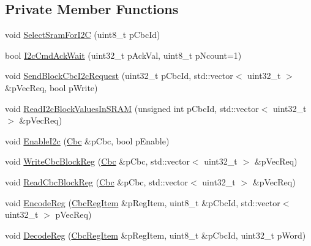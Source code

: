 \subsection*{Private Member Functions}
\begin{DoxyCompactItemize}
\item 
void \hyperlink{class_ph2___hw_interface_1_1_cbc_interface_afecc0475c57cec54253864c7407e765a}{Select\-Sram\-For\-I2\-C} (uint8\-\_\-t p\-Cbc\-Id)
\item 
bool \hyperlink{class_ph2___hw_interface_1_1_cbc_interface_ad171e07d3777cebcdd1f65cc03915e7b}{I2c\-Cmd\-Ack\-Wait} (uint32\-\_\-t p\-Ack\-Val, uint8\-\_\-t p\-Ncount=1)
\item 
void \hyperlink{class_ph2___hw_interface_1_1_cbc_interface_a3abc2efbdff0957b686341b3084b30a2}{Send\-Block\-Cbc\-I2c\-Request} (uint32\-\_\-t p\-Cbc\-Id, std\-::vector$<$ uint32\-\_\-t $>$ \&p\-Vec\-Req, bool p\-Write)
\item 
void \hyperlink{class_ph2___hw_interface_1_1_cbc_interface_a835236b210e7b642f471d862cb8c5f47}{Read\-I2c\-Block\-Values\-In\-S\-R\-A\-M} (unsigned int p\-Cbc\-Id, std\-::vector$<$ uint32\-\_\-t $>$ \&p\-Vec\-Req)
\item 
void \hyperlink{class_ph2___hw_interface_1_1_cbc_interface_a33464f7a75cd7e392d1324e223145b92}{Enable\-I2c} (\hyperlink{class_ph2___hw_description_1_1_cbc}{Cbc} \&p\-Cbc, bool p\-Enable)
\item 
void \hyperlink{class_ph2___hw_interface_1_1_cbc_interface_a47d3c0291aae360b85195ee3c22846e4}{Write\-Cbc\-Block\-Reg} (\hyperlink{class_ph2___hw_description_1_1_cbc}{Cbc} \&p\-Cbc, std\-::vector$<$ uint32\-\_\-t $>$ \&p\-Vec\-Req)
\item 
void \hyperlink{class_ph2___hw_interface_1_1_cbc_interface_a42ab8453dafd3f2d3c079536efde0569}{Read\-Cbc\-Block\-Reg} (\hyperlink{class_ph2___hw_description_1_1_cbc}{Cbc} \&p\-Cbc, std\-::vector$<$ uint32\-\_\-t $>$ \&p\-Vec\-Req)
\item 
void \hyperlink{class_ph2___hw_interface_1_1_cbc_interface_afa604881734cbe66e08b357cef693245}{Encode\-Reg} (\hyperlink{struct_ph2___hw_description_1_1_cbc_reg_item}{Cbc\-Reg\-Item} \&p\-Reg\-Item, uint8\-\_\-t \&p\-Cbc\-Id, std\-::vector$<$ uint32\-\_\-t $>$ p\-Vec\-Req)
\item 
void \hyperlink{class_ph2___hw_interface_1_1_cbc_interface_acf2c23c04d1f48b3d1ad875d63e6b98e}{Decode\-Reg} (\hyperlink{struct_ph2___hw_description_1_1_cbc_reg_item}{Cbc\-Reg\-Item} \&p\-Reg\-Item, uint8\-\_\-t \&p\-Cbc\-Id, uint32\-\_\-t p\-Word)
\end{DoxyCompactItemize}
